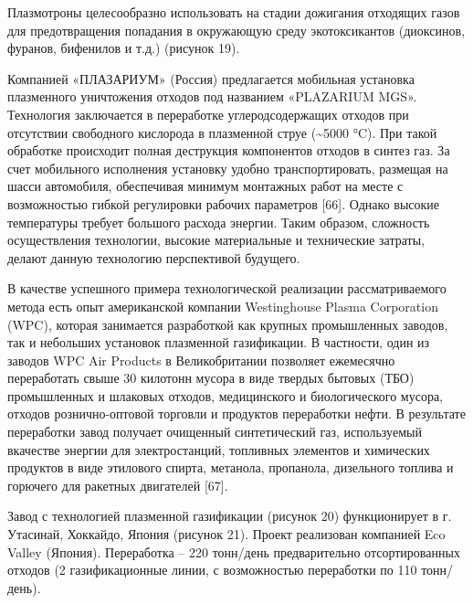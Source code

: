 \begin{multicols}{2}
Плазмотроны целесообразно использовать на стадии дожигания отходящих
газов для предотвращения попадания в окружающую среду экотоксикантов
(диоксинов, фуранов, бифенилов и т.д.) (рисунок 19).

Компанией «ПЛАЗАРИУМ» (Россия) предлагается мобильная установка
плазменного уничтожения отходов под названием «PLAZARIUM MGS».
Технология заклю­чается в переработке углеродсодержащих отходов при
отсутствии свободного кислорода в плазменной струе (\textasciitilde5000
°C). При такой обработке происходит полная деструкция компонентов
отходов в синтез газ. За счет мобильного исполнения установку удобно
транспорти­ровать, размещая на шасси автомобиля, обеспечивая минимум
монтажных работ на месте с возможностью гибкой регулировки рабочих
параметров {[}66{]}. Однако высокие температуры требует большого расхода
энергии. Таким образом, сложность осуществления технологии, высокие
материальные и технические затраты, делают данную технологию
перспективой будущего.

В качестве успешного примера технологической реализации рассматриваемого
метода есть опыт американской компании Westinghouse Plasma Corporation
(WPC), которая занимается разработкой как крупных промышленных заводов,
так и небольших установок плазменной газификации. В частности, один из
заводов WPC Air Products в Великобритании позволяет ежемесячно
переработать свыше 30 килотонн мусора в виде твердых бытовых (ТБО)
промышленных и шлаковых отходов, медицинского и биологического мусора,
отходов рознично-оптовой торговли и продуктов переработки нефти. В
результате переработки завод получает очищенный синтетический газ,
используемый вкачестве энергии для электростанций, топливных элементов и
химических продуктов в виде этилового спирта, метанола, пропанола,
дизельного топлива и горючего для ракетных двигателей {[}67{]}.

Завод с технологией плазменной газификации (рисунок 20) функционирует
в г. Утасинай, Хоккайдо, Япония (рисунок 21). Проект реализован
компанией Eco Valley (Япония). Переработка -- 220 тонн/день
предварительно отсортированных отходов (2 газификационные линии, с
возможностью переработки по 110 тонн/день).
\end{multicols}

